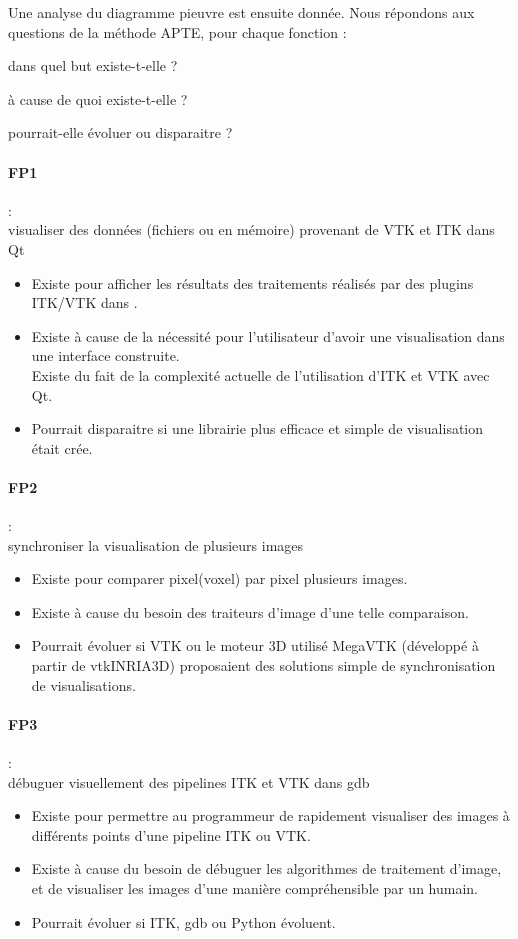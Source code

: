 \clearpage


Une analyse du diagramme pieuvre est ensuite donnée. Nous répondons aux questions de la méthode {APTE\textregistered}, pour chaque fonction :
\begin{inparaenum}[(i)] 
  \item dans quel but existe-t-elle ?
  \item à cause de quoi existe-t-elle ?
  \item pourrait-elle évoluer ou disparaitre ?
\end{inparaenum}


\paragraph*{FP1} :\\ visualiser des données (fichiers ou en mémoire) provenant de VTK et ITK dans Qt
\begin{itemize}
  \item Existe pour afficher les résultats des traitements réalisés par des plugins ITK/VTK dans {\gofigure}.
  \item Existe à cause de la nécessité pour l'utilisateur d'avoir une visualisation dans une interface construite.\\
  Existe du fait de la complexité actuelle de l'utilisation d'ITK et VTK avec Qt. 
  \item Pourrait disparaitre si une librairie plus efficace et simple de visualisation était crée.
\end{itemize}

\paragraph*{FP2} :\\ synchroniser la visualisation de plusieurs images
\begin{itemize}
  \item Existe pour comparer pixel(voxel) par pixel plusieurs images.
  \item Existe à cause du besoin des traiteurs d'image d'une telle comparaison.
  \item Pourrait évoluer si VTK ou le moteur 3D utilisé MegaVTK (développé à partir de vtkINRIA3D\cite{vtkINRIA})
  proposaient des solutions simple de synchronisation de visualisations.
\end{itemize}

\paragraph*{FP3} :\\ débuguer visuellement des pipelines ITK et VTK dans gdb
\begin{itemize}
  \item Existe pour permettre au programmeur de rapidement visualiser des images
   à différents points d'une pipeline ITK ou VTK.
  \item Existe à cause du besoin de débuguer les algorithmes de traitement d'image,
  et de visualiser les images d'une manière compréhensible par un humain.
  \item Pourrait évoluer si ITK, gdb ou Python évoluent.
\end{itemize}

